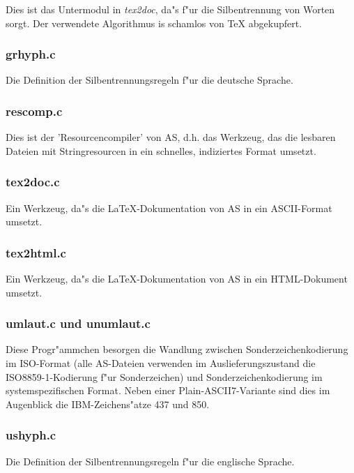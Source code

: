\documentclass[12pt,a4paper,twoside]{report}
\begin{document}
Dies ist das Untermodul in {\em tex2doc}, da"s f"ur die Silbentrennung von
Worten sorgt.  Der verwendete Algorithmus is schamlos von TeX
abgekupfert.

\subsubsection{grhyph.c}

Die Definition der Silbentrennungsregeln f"ur die deutsche Sprache.

\subsubsection{rescomp.c}

Dies ist der 'Resourcencompiler' von AS, d.h. das Werkzeug, das die
lesbaren Dateien mit Stringresourcen in ein schnelles, indiziertes Format
umsetzt.

\subsubsection{tex2doc.c}

Ein Werkzeug, da"s die LaTeX-Dokumentation von AS in ein ASCII-Format
umsetzt.

\subsubsection{tex2html.c}

Ein Werkzeug, da"s die LaTeX-Dokumentation von AS in ein HTML-Dokument
umsetzt.

\subsubsection{umlaut.c und unumlaut.c}

Diese Progr"ammchen besorgen die Wandlung zwischen Sonderzeichenkodierung
im ISO-Format (alle AS-Dateien verwenden im Auslieferungszustand die
ISO8859-1-Kodierung f"ur Sonderzeichen) und Sonderzeichenkodierung im
systemspezifischen Format.  Neben einer Plain-ASCII7-Variante sind dies im
Augenblick die IBM-Zeichens"atze 437 und 850.

\subsubsection{ushyph.c}

Die Definition der Silbentrennungsregeln f"ur die englische Sprache.

\end{document}
